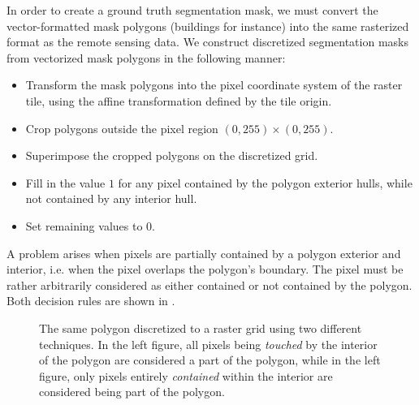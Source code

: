 In order to create a ground truth segmentation mask, we must convert the vector-formatted mask polygons (buildings for instance) into the same rasterized format as the remote sensing data.
We construct discretized segmentation masks from vectorized mask polygons in the following manner:

\begin{itemize}
  \item Transform the mask polygons into the pixel coordinate system of the raster tile, using the affine transformation defined by the tile origin.
  \item Crop polygons outside the pixel region $(0, 255) \times (0, 255)$.
  \item Superimpose the cropped polygons on the discretized grid.
  \item Fill in the value $1$ for any pixel contained by the polygon exterior hulls, while not contained by any interior hull.
  \item Set remaining values to $0$.
\end{itemize}

A problem arises when pixels are partially contained by a polygon exterior and interior, i.e. when the pixel overlaps the polygon's boundary.
The pixel must be rather arbitrarily considered as either contained or not contained by the polygon.
Both decision rules are shown in .

\begin{figure}[H]
  \centering
  
  \hspace{2em}
  
  \caption{
    The same polygon discretized to a raster grid using two different techniques.
    In the left figure, all pixels being \textit{touched} by the interior of the polygon
    are considered a part of the polygon, while in the left figure, only pixels
    entirely \textit{contained} within the interior are considered being part
    of the polygon.
  }
  \label{fig:pixel-containment}
\end{figure}
